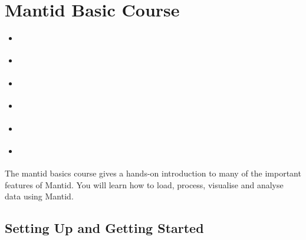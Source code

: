 \documentclass[letterpaper,10pt,english,openany]{sphinxmanual}
\begin{document}
\chapter{Mantid Basic Course}
\label{\detokenize{mantid_basic_course/index:mantid-basic-course}}\label{\detokenize{mantid_basic_course/index:id1}}\label{\detokenize{mantid_basic_course/index::doc}}
\begin{itemize}
\item {} 
{\hyperref[\detokenize{mantid_basic_course/getting_started/getting_started:getting-started}]{}}

\item {} 
{\hyperref[\detokenize{mantid_basic_course/loading_and_displaying_data/index:loading-and-displaying-data}]{}}

\item {} 
{\hyperref[\detokenize{mantid_basic_course/algorithms_workspaces_and_histories/index:algorithms-workspaces-and-histories}]{}}

\item {} 
{\hyperref[\detokenize{mantid_basic_course/connecting_data_to_instruments/index:connecting-data-to-instruments}]{}}

\item {} 
{\hyperref[\detokenize{mantid_basic_course/fitting_data/index:fitting-data}]{}}

\item {} 
{\hyperref[\detokenize{mantid_basic_course/using_workbench/index:using-workbench}]{}}

\end{itemize}

The mantid basics course gives a hands-on introduction to many of the important features of Mantid.
You will learn how to load, process, visualise and analyse data using Mantid.


\section{Setting Up and Getting Started}
\label{\detokenize{mantid_basic_course/getting_started/getting_started:setting-up-and-getting-started}}\label{\detokenize{mantid_basic_course/getting_started/getting_started:getting-started}}\label{\detokenize{mantid_basic_course/getting_started/getting_started::doc}}
\end{document}
